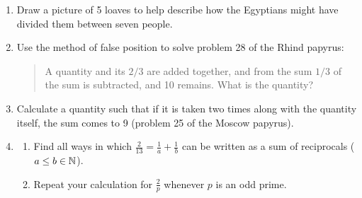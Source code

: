 \begin{exercises*}{}{}
\begin{enumerate}
	  \item Draw a picture of 5 loaves to help describe how the Egyptians might have divided them between seven people.
	  
	  \item%
	  Use the method of false position to solve problem 28 of the Rhind papyrus:
	  \begin{quote}
	  	A quantity and its $2/3$ are added together, and from the sum $1/3$ of the sum is subtracted, and 10 remains. What is the quantity?
	  \end{quote}

	  \item %
	  Calculate a quantity such that if it is taken two times along with the quantity itself, the sum comes to 9  (problem 25 of the Moscow papyrus).

		\item\begin{enumerate}
		  \item Find all ways in which $\frac 2{13}=\frac 1a+\frac 1b$ can be written as a sum of reciprocals ($a\le b\in\mathbb{N}$).
		  \item Repeat your calculation for $\frac 2p$ whenever $p$ is an odd prime.
		\end{enumerate}
	\end{enumerate}
\end{exercises*}

